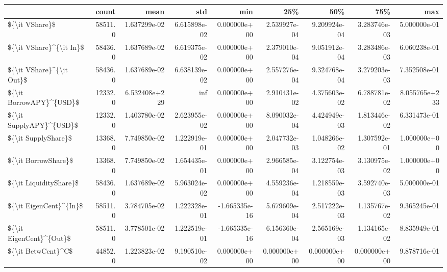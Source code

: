 \begin{tabular}{lrrrrrrrr}
\toprule
{} &    count &           mean &           std &           min &           25\% &           50\% &           75\% &            max \\
\midrule
\$\{\textbackslash it VShare\}\$             &  58511.0 &   1.637299e-02 &  6.615898e-02 &  0.000000e+00 &  2.539927e-04 &  9.209924e-04 &  3.283746e-03 &   5.000000e-01 \\
\$\{\textbackslash it VShare\}\textasciicircum \{\textbackslash it In\}\$    &  58436.0 &   1.637689e-02 &  6.619375e-02 &  0.000000e+00 &  2.379010e-04 &  9.051912e-04 &  3.283486e-03 &   6.060238e-01 \\
\$\{\textbackslash it VShare\}\textasciicircum \{\textbackslash it Out\}\$   &  58436.0 &   1.637689e-02 &  6.638139e-02 &  0.000000e+00 &  2.557276e-04 &  9.324768e-04 &  3.279203e-03 &   7.352508e-01 \\
\$\{\textbackslash it BorrowAPY\}\textasciicircum \{USD\}\$    &  12332.0 &  6.532408e+229 &           inf &  0.000000e+00 &  2.910431e-02 &  4.375603e-02 &  6.788781e-02 &  8.055765e+233 \\
\$\{\textbackslash it SupplyAPY\}\textasciicircum \{USD\}\$    &  12332.0 &   1.403780e-02 &  2.623955e-02 &  0.000000e+00 &  8.090032e-04 &  4.424949e-03 &  1.813446e-02 &   6.331473e-01 \\
\$\{\textbackslash it SupplyShare\}\$        &  13368.0 &   7.749850e-02 &  1.222919e-01 &  0.000000e+00 &  2.047732e-03 &  1.048266e-02 &  1.307592e-01 &   1.000000e+00 \\
\$\{\textbackslash it BorrowShare\}\$        &  13368.0 &   7.749850e-02 &  1.654435e-01 &  0.000000e+00 &  2.966585e-04 &  3.122754e-03 &  3.130975e-02 &   1.000000e+00 \\
\$\{\textbackslash it LiquidityShare\}\$     &  58436.0 &   1.637689e-02 &  5.963024e-02 &  0.000000e+00 &  4.559236e-04 &  1.218559e-03 &  3.592740e-03 &   5.000000e-01 \\
\$\{\textbackslash it EigenCent\}\textasciicircum \{In\}\$     &  58511.0 &   3.784705e-02 &  1.222328e-01 & -1.665335e-16 &  5.679609e-04 &  2.517222e-03 &  1.135767e-02 &   9.365245e-01 \\
\$\{\textbackslash it EigenCent\}\textasciicircum \{Out\}\$    &  58511.0 &   3.778501e-02 &  1.222519e-01 & -1.665335e-16 &  6.156360e-04 &  2.565169e-03 &  1.134165e-02 &   8.835949e-01 \\
\$\{\textbackslash it BetwCent\}\textasciicircum C\$         &  44852.0 &   1.223823e-02 &  9.190510e-02 &  0.000000e+00 &  0.000000e+00 &  0.000000e+00 &  0.000000e+00 &   9.878716e-01 \\

\end{tabular}
